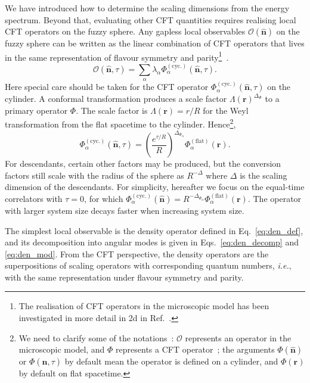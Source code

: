\documentclass{timesjhep}
\begin{document}
We have introduced how to determine the scaling dimensions from the energy spectrum. Beyond that, evaluating other CFT quantities requires realising local CFT operators on the fuzzy sphere. Any gapless local observables $\mathcal{O}(\hat{\mathbf{n}})$ on the fuzzy sphere can be written as the linear combination of CFT operators that lives in the same representation of flavour symmetry and parity\footnote{The realisation of CFT operators in the microscopic model has been investigated in more detail in 2d in Ref.~\cite{Zou2019Operator2d}.}~\cite{Hu2023Mar}. 
\begin{equation}
    \mathcal{O}(\hat{\mathbf{n}},\tau)=\sum_\alpha \lambda_\alpha\Phi^{(\mathrm{cyc.})}_\alpha(\hat{\mathbf{n}},\tau).
\end{equation} 
Here special care should be taken for the CFT operator $\Phi^{(\mathrm{cyc.})}_\alpha(\hat{\mathbf{n}},\tau)$ on the cylinder. A conformal transformation produces a scale factor $\Lambda(\mathbf{r})^{\Delta_\Phi}$ to a primary operator $\Phi$. The scale factor is $\Lambda(\mathbf{r})=r/R$ for the Weyl transformation from the flat spacetime to the cylinder. Hence\footnote{We need to clarify some of the notations~: $\mathcal{O}$ represents an operator in the microscopic model, and $\Phi$ represents a CFT operator~; the arguments $\Phi(\hat{\mathbf{n}})$ or $\Phi(\hat{\mathbf{n}},\tau)$ by default mean the operator is defined on a cylinder, and $\Phi(\mathbf{r})$ by default on flat spacetime.},
\begin{equation}
    \Phi^{(\mathrm{cyc.})}_\alpha(\hat{\mathbf{n}},\tau)=\left(\frac{e^{\tau/R}}{R}\right)^{\Delta_{\Phi_\alpha}}\Phi_\alpha^{\mathrm{(flat)}}(\mathbf{r}).
\end{equation}
For descendants, certain other factors may be produced, but the conversion factors still scale with the radius of the sphere as $R^{-\Delta}$ where $\Delta$ is the scaling dimension of the descendants. For simplicity, hereafter we focus on the equal-time correlators with $\tau=0$, for which $\Phi^{(\mathrm{cyc.})}_\alpha(\hat{\mathbf{n}})=R^{-\Delta_{\Phi_\alpha}}\Phi_\alpha^{\mathrm{(flat)}}(\mathbf{r})$. The operator with larger system size decays faster when increasing system size. 

The simplest local observable is the density operator defined in Eq.~\eqref{eq:den_def}, and its decomposition into angular modes is given in Eqs.~\eqref{eq:den_decomp} and \eqref{eq:den_mod}. From the CFT perspective, the density operators are the superpositions of scaling operators with corresponding quantum numbers, \textit{i.e.}, with the same representation under flavour symmetry and parity. 
\end{document}
